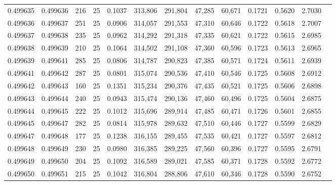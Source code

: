 \begin{tabular}{rrrrrrrrrrrrr}
0.499635 & 0.499636 & 216 &  25 &                                     0.1037 & 313,806 & 291,804 &  47,285 &  60,671 & 0.1721 & 0.5620 & 2.7030 \\
0.499636 & 0.499637 & 251 &  25 &                                     0.0906 & 314,057 & 291,553 &  47,310 &  60,646 & 0.1722 & 0.5618 & 2.7007 \\
0.499637 & 0.499638 & 235 &  25 &                                     0.0962 & 314,292 & 291,318 &  47,335 &  60,621 & 0.1722 & 0.5615 & 2.6985 \\
0.499638 & 0.499639 & 210 &  25 &                                     0.1064 & 314,502 & 291,108 &  47,360 &  60,596 & 0.1723 & 0.5613 & 2.6965 \\
0.499639 & 0.499641 & 285 &  25 &                                     0.0806 & 314,787 & 290,823 &  47,385 &  60,571 & 0.1724 & 0.5611 & 2.6939 \\
0.499641 & 0.499642 & 287 &  25 &                                     0.0801 & 315,074 & 290,536 &  47,410 &  60,546 & 0.1725 & 0.5608 & 2.6912 \\
0.499642 & 0.499643 & 160 &  25 &                                     0.1351 & 315,234 & 290,376 &  47,435 &  60,521 & 0.1725 & 0.5606 & 2.6898 \\
0.499643 & 0.499644 & 240 &  25 &                                     0.0943 & 315,474 & 290,136 &  47,460 &  60,496 & 0.1725 & 0.5604 & 2.6875 \\
0.499644 & 0.499645 & 222 &  25 &                                     0.1012 & 315,696 & 289,914 &  47,485 &  60,471 & 0.1726 & 0.5601 & 2.6855 \\
0.499645 & 0.499647 & 282 &  25 &                                     0.0814 & 315,978 & 289,632 &  47,510 &  60,446 & 0.1727 & 0.5599 & 2.6829 \\
0.499647 & 0.499648 & 177 &  25 &                                     0.1238 & 316,155 & 289,455 &  47,535 &  60,421 & 0.1727 & 0.5597 & 2.6812 \\
0.499648 & 0.499649 & 230 &  25 &                                     0.0980 & 316,385 & 289,225 &  47,560 &  60,396 & 0.1727 & 0.5595 & 2.6791 \\
0.499649 & 0.499650 & 204 &  25 &                                     0.1092 & 316,589 & 289,021 &  47,585 &  60,371 & 0.1728 & 0.5592 & 2.6772 \\
0.499650 & 0.499651 & 215 &  25 &                                     0.1042 & 316,804 & 288,806 &  47,610 &  60,346 & 0.1728 & 0.5590 & 2.6752 \\

\end{tabular}
